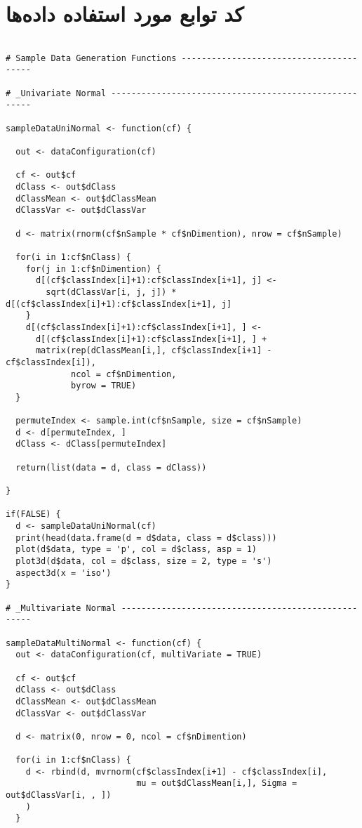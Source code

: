 \section*{
کد توابع مورد استفاده داده‌ها }
\begin{latin}
\begin{Verbatim}[breaklines=true, breakanywhere=true, baselinestretch=1]

# Sample Data Generation Functions ----------------------------------------

# _Univariate Normal ------------------------------------------------------

sampleDataUniNormal <- function(cf) {
  
  out <- dataConfiguration(cf)
  
  cf <- out$cf
  dClass <- out$dClass
  dClassMean <- out$dClassMean
  dClassVar <- out$dClassVar
  
  d <- matrix(rnorm(cf$nSample * cf$nDimention), nrow = cf$nSample)
  
  for(i in 1:cf$nClass) {
    for(j in 1:cf$nDimention) {
      d[(cf$classIndex[i]+1):cf$classIndex[i+1], j] <-
        sqrt(dClassVar[i, j, j]) * d[(cf$classIndex[i]+1):cf$classIndex[i+1], j]
    }
    d[(cf$classIndex[i]+1):cf$classIndex[i+1], ] <- 
      d[(cf$classIndex[i]+1):cf$classIndex[i+1], ] +
      matrix(rep(dClassMean[i,], cf$classIndex[i+1] - cf$classIndex[i]), 
             ncol = cf$nDimention,
             byrow = TRUE)
  }
  
  permuteIndex <- sample.int(cf$nSample, size = cf$nSample)
  d <- d[permuteIndex, ]
  dClass <- dClass[permuteIndex]
  
  return(list(data = d, class = dClass))
  
}

if(FALSE) {
  d <- sampleDataUniNormal(cf)
  print(head(data.frame(d = d$data, class = d$class)))
  plot(d$data, type = 'p', col = d$class, asp = 1)
  plot3d(d$data, col = d$class, size = 2, type = 's')
  aspect3d(x = 'iso')
}

# _Multivariate Normal ----------------------------------------------------

sampleDataMultiNormal <- function(cf) {
  out <- dataConfiguration(cf, multiVariate = TRUE)
  
  cf <- out$cf
  dClass <- out$dClass
  dClassMean <- out$dClassMean
  dClassVar <- out$dClassVar
  
  d <- matrix(0, nrow = 0, ncol = cf$nDimention)
  
  for(i in 1:cf$nClass) {
    d <- rbind(d, mvrnorm(cf$classIndex[i+1] - cf$classIndex[i],
                          mu = out$dClassMean[i,], Sigma = out$dClassVar[i, , ])
    )
  }
  

\end{Verbatim}
\end{latin}
